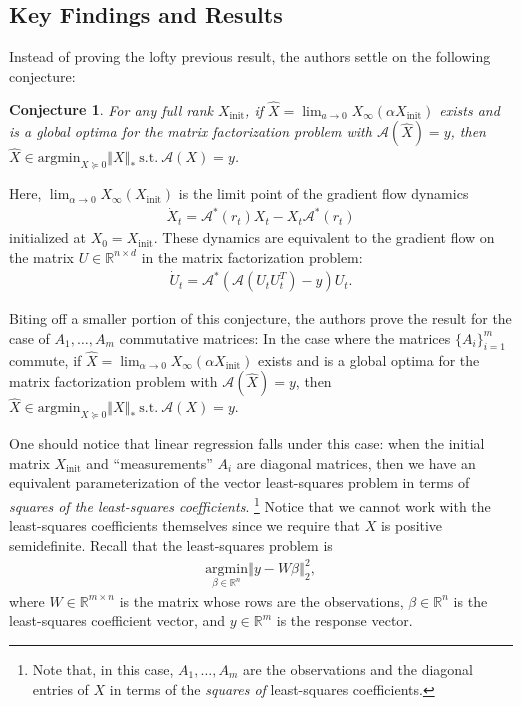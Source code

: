 \documentclass{article}
\newenvironment{manualtheorem}[1]{%
  \renewcommand\themanualtheoreminner{#1}%
  \manualtheoreminner
}{\endmanualtheoreminner}
\newtheorem*{conjecture}{Conjecture}
\begin{document}
\subsection{Key Findings and Results}
Instead of proving the lofty previous result, the authors settle on the following conjecture:
\begin{conjecture}
For any full rank $X_{\text{init}}$, if $\widehat{X} = \lim_{a \rightarrow 0} X_{\infty}(\alpha X_{\text{init}})$ exists and is a global optima for the matrix factorization problem with $\mathcal{A}(\widehat{X}) = y$, then $\widehat{X} \in \text{argmin}_{X \succeq 0} \left \Vert X \right \Vert_* \ \text{s.t.} \ \mathcal{A}(X) = y$. 
\end{conjecture}
Here, $\lim_{\alpha \rightarrow 0} X_{\infty}(X_{\text{init}})$ is the limit point of the gradient flow dynamics
\begin{align*}
    \dot{X}_t = \mathcal{A}^*(r_t)X_t - X_t\mathcal{A}^*(r_t)
\end{align*}
initialized at $X_0 = X_{\text{init}}$. These dynamics are equivalent to the gradient flow on the matrix $U \in \mathbb{R}^{n \times d}$ in the matrix factorization problem:
\begin{align*}
    \dot{U}_t = \mathcal{A}^*(\mathcal{A}(U_t U_t^T) - y)U_t.
\end{align*}

Biting off a smaller portion of this conjecture, the authors prove the result for the case of $A_1, \ldots, A_m$ commutative matrices:
\begin{manualtheorem}{1}\label{gunasekharthm1}
In the case where the matrices $\{A_i\}_{i=1}^m$ commute, if $\widehat{X} = \lim_{\alpha \rightarrow 0} X_{\infty}(\alpha X_{\text{init}})$ exists and is a global optima for the matrix factorization problem with $\mathcal{A}(\widehat{X}) = y$, then $\widehat{X} \in \text{argmin}_{X \succeq 0} \left \Vert X \right \Vert_* \ \text{s.t.} \ \mathcal{A}(X) = y$.
\end{manualtheorem}

One should notice that linear regression falls under this case: when the initial matrix $X_{\text{init}}$ and \enquote{measurements} $A_i$ are diagonal matrices, then we have an equivalent parameterization of the vector least-squares problem in terms of \textit{squares of the least-squares coefficients}. \footnote{Note that, in this case, $A_1, \ldots, A_m$ are the observations and the diagonal entries of $X$ in terms of the \textit{squares of} least-squares coefficients.} Notice that we cannot work with the least-squares coefficients themselves since we require that $X$ is positive semidefinite. Recall that the least-squares problem is 
\begin{align*}
  \underset{\beta \in \mathbb{R}^n}{\text{argmin}} \left\Vert y - W\beta \right\Vert_2^2,
\end{align*}
where $W \in \mathbb{R}^{m \times n}$ is the matrix whose rows are the observations, $\beta \in \mathbb{R}^n$ is the least-squares coefficient vector, and $y\in \mathbb{R}^m$ is the response vector.
\end{document}

